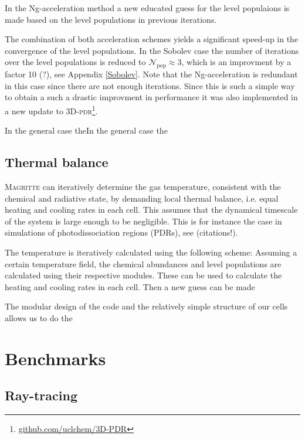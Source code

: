 \documentclass[a4paper,fleqn,usenatbib]{mnras}
\begin{document}
In the Ng-acceleration method \citep{Ng1974} a new educated guess for the level populaions is made based on the level populations in previous iterations.

The combination of both acceleration schemes yields a significant speed-up in the convergence of the level populations. In the Sobolev case the number of iterations over the level populations is reduced to $\mathcal{N}_{\text{pop}} \approx 3$, which is an improvment by a factor 10 (?), see Appendix \ref{Sobolev}. Note that the Ng-acceleration is redundant in this case since there are not enough iterations. Since this is such a simple way to obtain a such a drastic improvment in performance it was also implemented in a new update to \textsc{3D-pdr}\footnote{\href{https://github.com/uclchem/3D-PDR}{github.com/uclchem/3D-PDR}}.



In the general case theIn the general case the
\subsection{Thermal balance}

\textsc{Magritte} can iteratively determine the gas temperature, consistent with the chemical and radiative state, by demanding local thermal balance, i.e. equal heating and cooling rates in each cell. This assumes that the dynamical timescale of the system is large enough to be negligible. This is for instance the case in simulations of photodissociation regions (PDRs), see (citations!).

The temperature is iteratively calculated using the following scheme: Assuming a certain temperature field, the chemical abundances and level populations are calculated using their respective modules. These can be used to calculate the heating and cooling rates in each cell. Then a new guess can be made

The modular design of the code and the relatively simple structure of our cells allows us to do the




\section{Benchmarks}
\label{Benchmarks}

\subsection{Ray-tracing}
\end{document}
